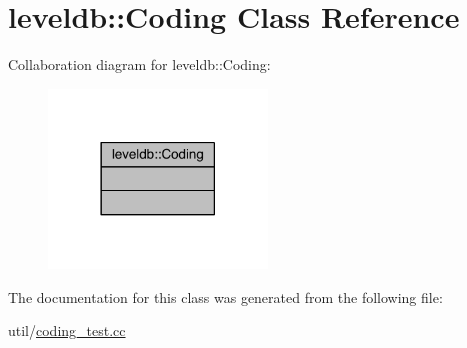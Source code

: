 \hypertarget{classleveldb_1_1_coding}{}\section{leveldb\+:\+:Coding Class Reference}
\label{classleveldb_1_1_coding}


Collaboration diagram for leveldb\+:\+:Coding\+:\nopagebreak
\begin{figure}[H]
\begin{center}
\leavevmode
\includegraphics[width=165pt]{classleveldb_1_1_coding__coll__graph}
\end{center}
\end{figure}


The documentation for this class was generated from the following file\+:\begin{DoxyCompactItemize}
\item 
util/\hyperlink{coding__test_8cc}{coding\+\_\+test.\+cc}\end{DoxyCompactItemize}
